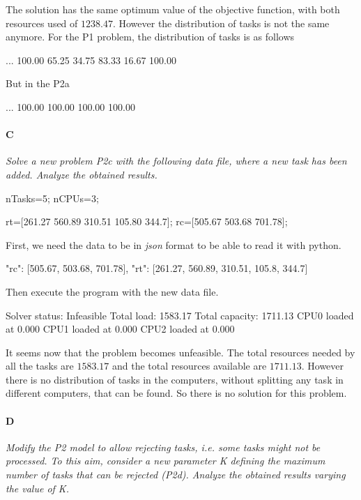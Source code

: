 \documentclass[11pt,a4paper]{article}
\begin{document}
The solution has the same optimum value of the objective function, with both 
resources used of $1238.47$. However the distribution of tasks is not the same 
anymore.
%
For the P1 problem, the distribution of tasks is as follows
\begin{textcode}
...
100.00%
 65.25%
 34.75%
 83.33%
 16.67%
100.00%
\end{textcode}
%
But in the P2a
\begin{textcode}
...
100.00%
100.00%
100.00%
100.00%
\end{textcode}


%
\paragraph*{C}
{\sl Solve a new problem P2c with the following data file, where a new task has 
been added. Analyze the obtained results.}
%
\begin{textcode}
nTasks=5;
nCPUs=3;

rt=[261.27 560.89 310.51 105.80 344.7];
rc=[505.67 503.68 701.78];
\end{textcode}
%
First, we need the data to be in {\sl json} format to be able to read it with 
python.
\begin{textcode}
{
        "rc": [505.67, 503.68, 701.78],
        "rt": [261.27, 560.89, 310.51, 105.8, 344.7]
}
\end{textcode}
%
Then execute the program with the new data file.
%
\begin{textcode}
Solver status: Infeasible
Total load: 1583.17
Total capacity: 1711.13
CPU0 loaded at 0.000
CPU1 loaded at 0.000
CPU2 loaded at 0.000
\end{textcode}
%
It seems now that the problem becomes unfeasible. The total resources needed by 
all the tasks are $1583.17$ and the total resources available are $1711.13$.  
However there is no distribution of tasks in the computers, without splitting 
any task in different computers, that can be found. So there is no solution for 
this problem.
%

\paragraph*{D}
{\sl Modify the P2 model to allow rejecting tasks, i.e. some tasks might not be 
processed. To this aim, consider a new parameter K defining the maximum number 
of tasks that can be rejected (P2d). Analyze the obtained results varying the 
value of K.}
\end{document}

